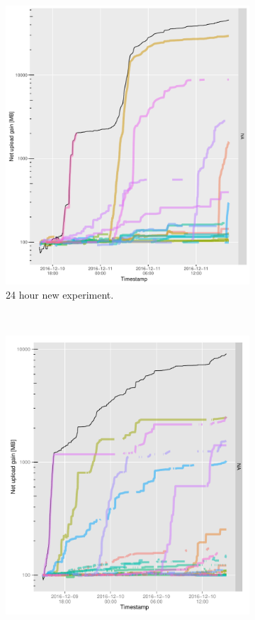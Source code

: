 \begin{figure}[h]
	\begin{adjustwidth}{-2cm}{}
		\begin{subfigure}[t]{0.6\textwidth}
			\centering
			\includegraphics[width=\textwidth]{pics/results/b136.pdf}
			\caption{24 hour new experiment.}
			\label{fig:newetree24}
		\end{subfigure}
		~
		\begin{subfigure}[t]{0.6\textwidth}
			\centering
			\includegraphics[width=\textwidth]{pics/results/m138.pdf}

\end{subfigure}
\end{adjustwidth}
\end{figure}

